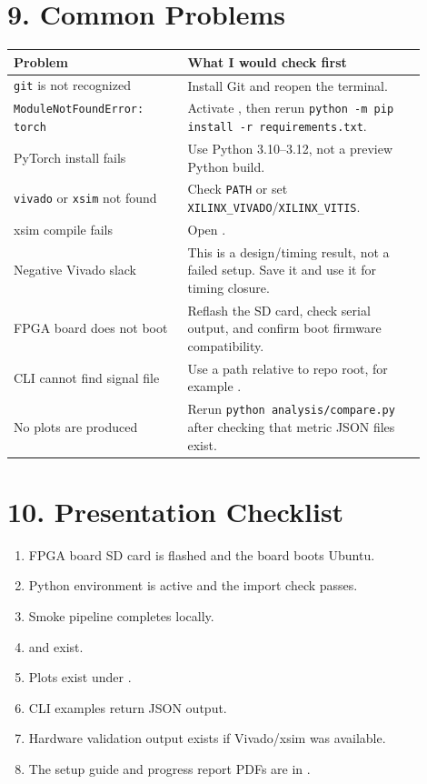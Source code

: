 \documentclass[11pt]{article}
\begin{document}
\section{9. Common Problems}
\begin{center}
\begin{tabular}{L{0.38\linewidth}L{0.52\linewidth}}
\toprule
Problem & What I would check first \\
\midrule
\texttt{git} is not recognized & Install Git and reopen the terminal. \\
\texttt{ModuleNotFoundError: torch} & Activate , then rerun \texttt{python -m pip install -r requirements.txt}. \\
PyTorch install fails & Use Python 3.10--3.12, not a preview Python build. \\
\texttt{vivado} or \texttt{xsim} not found & Check \texttt{PATH} or set \texttt{XILINX\_VIVADO}/\texttt{XILINX\_VITIS}. \\
xsim compile fails & Open . \\
Negative Vivado slack & This is a design/timing result, not a failed setup. Save it and use it for timing closure. \\
FPGA board does not boot & Reflash the SD card, check serial output, and confirm boot firmware compatibility. \\
CLI cannot find signal file & Use a path relative to repo root, for example . \\
No plots are produced & Rerun \texttt{python analysis/compare.py} after checking that metric JSON files exist. \\
\bottomrule
\end{tabular}
\end{center}

\section{10. Presentation Checklist}
\begin{enumerate}[leftmargin=*]
\item FPGA board SD card is flashed and the board boots Ubuntu.
\item Python environment is active and the import check passes.
\item Smoke pipeline completes locally.
\item {} and 
exist.
\item Plots exist under .
\item CLI examples return JSON output.
\item Hardware validation output exists if Vivado/xsim was available.
\item The setup guide and progress report PDFs are in .
\end{enumerate}
\end{document}
